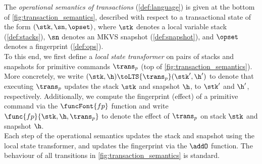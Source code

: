 The \emph{operational semantics of transactions} (\cref{def:language}) is given at the bottom of  \cref{fig:transaction_semantics},
described with respect to a transactional state of the form \((\stk, \sn, \opset)\), where $\stk$ denotes a local variable stack (\cref{def:stacks}), $\sn$ denotes an MKVS snapshot (\cref{def:snapshot}), and $\opset$ denotes a fingerprint (\cref{def:ops}).\\
%
\indent To this end, we first define a \emph{local state transformer} on pairs of stacks and snapshots for primitive commands \(\trans_{p}\) (top of  \cref{fig:transaction_semantics}).
More concretely, we write $(\stk, \h)  \toLTS{\trans_{p}} (\stk', \h')$ to denote that executing $\trans_p$ updates the stack $\stk$ and snapshot $\h$, to $\stk'$ and $\h'$, respectively.
Additionally, we compute the fingerprint (effect) of a primitive command via the $\funcFont{fp}$ function and write $\func{fp}{\stk, \h, \trans_p}$ to denote the effect of $\trans_p$ on stack $\stk$ and snapshot $\h$.\\
%
%
\indent Each step of the operational semantics updates the stack and snapshot using the local state transformer, and updates the fingerprint via the \( \addO \) function.
The behaviour of all transitions in \cref{fig:transaction_semantics} is standard.


